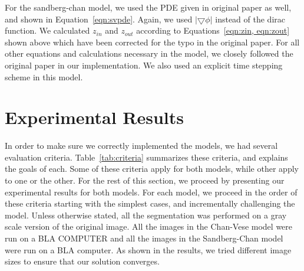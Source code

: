 \documentclass[10pt,twocolumn,letterpaper]{article}
\begin{document}
For the sandberg-chan model, we used the PDE given in original paper as well, and shown in Equation~\ref{eqn:svpde}. Again, we used $|\bigtriangledown\phi|$
instead of the dirac function. We calculated $z_{in}$ and $z_{out}$ according to Equations~\ref{eqn:zin, eqn:zout} shown above which have been corrected for
the typo in the original paper. For all other equations and calculations necessary in the model, we closely followed the original paper in our implementation.
We also used an explicit time stepping scheme in this model. 


\section{Experimental Results}
\label{sec:results}

In order to make sure we correctly implemented the models, we had several evaluation criteria. Table~\ref{tab:criteria} summarizes these criteria, and explains
the goals of each. Some of these criteria apply for both models, while other apply to one or the other. For the rest of this section, we proceed by presenting
our experimental results for both models. For each model, we proceed in the order of these criteria starting with the simplest
cases, and incrementally challenging the model. Unless otherwise stated, all the segmentation was performed on a gray scale version of the original image. All
the images in the Chan-Vese model were run on a BLA COMPUTER and all the images in the Sandberg-Chan model were run on a BLA computer. As shown in the results,
we tried different image sizes to ensure that our solution converges.
\end{document}
